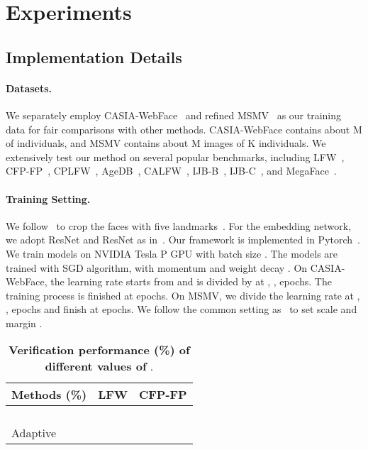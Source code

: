 \documentclass[10pt,twocolumn,letterpaper]{article}
\begin{document}
\section{Experiments}
\subsection{Implementation Details}
\paragraph{Datasets.}
We separately employ CASIA-WebFace~\cite{Yi2014learning} and refined MSMV~\cite{deng2018arcface} as our training data for fair comparisons with other methods. CASIA-WebFace contains about M of  individuals, and MSMV contains about M images of K individuals.
We extensively test our method on several popular benchmarks, including LFW~\cite{LFWTech}, CFP-FP~\cite{sengupta2016frontal}, CPLFW~\cite{CPLFWTech}, AgeDB~\cite{moschoglou2017agedb}, CALFW~\cite{zheng2017crossage},  IJB-B~\cite{whitelam2017iarpa}, IJB-C~\cite{maze2018iarpa}, and MegaFace~\cite{kemelmacher2016megaface}.

\paragraph{Training Setting.}
We follow~\cite{deng2018arcface} to crop the  faces with five landmarks~\cite{zhang2016mtcnn,tai2019towards}.
For the embedding network, we adopt ResNet and ResNet as in~\cite{deng2018arcface}.
Our framework is implemented in Pytorch~\cite{paszke2017automatic}.
We train models on  NVIDIA Tesla P GPU with batch size . The models are trained with SGD algorithm, with momentum  and weight decay . On CASIA-WebFace, the learning rate starts from  and is divided by  at , ,  epochs.
The training process is finished at  epochs.
On MSMV, we divide the learning rate at , ,  epochs and finish at  epochs. We follow the common setting as~\cite{deng2018arcface} to set scale  and margin  .


\begin{table}[t!]
\begin{center}
\small
\caption{\small \textbf{Verification performance (\%) of different values of }.}
\label{tab:comp_different_values_of_t}
\begin{tabular}{l|cc}
\hline
Methods (\%)           & LFW  & CFP-FP  \\ \hline\hline
               &  &   \\
             &  &   \\
             &  &   \\
               &  &   \\\hline
Adaptive         &  &   \\\hline
\end{tabular}
\end{center}
\end{table}
\end{document}
